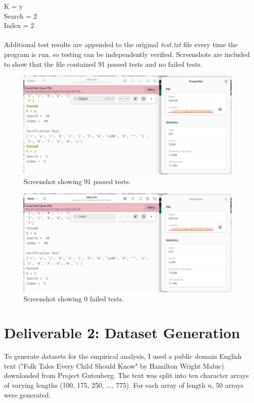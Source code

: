 \documentclass{article}
\begin{document}
K = y \\
Search =  2 \\
Index =  2 \\
\\
\rmfamily
Additional test results are appended to the original \textit{test.txt} file every time the program is run, so testing can be independently verified. Screenshots are included to show that the file contained 91 passed tests and no failed tests. 
    \begin{figure}[H]
	\centering
	\includegraphics[width=\textwidth]{Screenshot from 2024-10-06 12-56-32.png}
	\caption{Screenshot showing 91 passed tests.}
    \end{figure}
    
    \begin{figure}[H]
	\centering
	\includegraphics[width=\textwidth]{Screenshot from 2024-10-06 12-57-31.png}
	\caption{Screenshot showing 0 failed tests.}
    \end{figure}

\section{Deliverable 2: Dataset Generation}
To generate datasets for the empirical analysis, I used a public domain English text ("Folk Tales Every Child Should Know" by Hamilton Wright Mabie) downloaded from Project Gutenberg. The text was split into ten character arrays of varying lengths (100, 175, 250, ..., 775). For each array of length \( n \), 50 arrays were generated.
\end{document}
